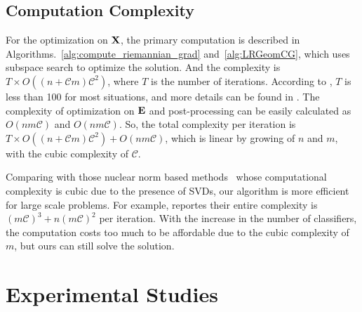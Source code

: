 \documentclass[letterpaper]{article} %
\def\bE{{\bf E}}
\def\calC{{\mathcal{C}}}
\def\bX{{\bf X}}
\def\bX{{\bf X}}
\begin{document}
\subsection{Computation Complexity}

For the optimization on $\bX$, the primary computation is described in Algorithms.~\ref{alg:compute_riemannian_grad} and~\ref{alg:LRGeomCG},
which uses subspace search to optimize the solution.
And the complexity is $T \times O((n+{\calC}m){\calC}^2)$, where $T$ is the number of iterations.
According to \cite{vandereycken2013lowrank}, $T$ is less than 100 for most situations,
and more details can be found in \cite{vandereycken2013lowrank}.
The complexity of optimization on $\bE$ and post-processing can be easily calculated as $O(nm{\calC})$ and $O(nm{\calC})$.
So, the total complexity per iteration is $T \times O((n+{\calC}m){\calC}^2) + O(nm{\calC})$,
which is linear by growing of $n$ and $m$, with the cubic complexity of $\calC$.

Comparing with those nuclear norm based methods~\cite{gaoijcai2016robust,ye2012robust} whose computational complexity is cubic due to the presence of SVDs,
our algorithm is more efficient for large scale problems.
For example, \cite{gaoijcai2016robust} reportes their entire complexity is $(m{\calC})^3+n(m{\calC})^2$ per iteration.
With the increase in the number of classifiers,
the computation costs too much to be affordable due to the cubic complexity of $m$,
but ours can still solve the solution.

\section{Experimental Studies}
\end{document}

